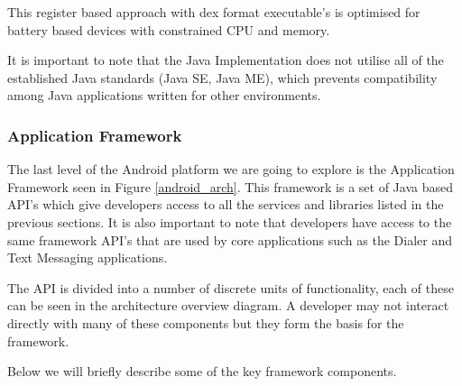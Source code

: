 This register based approach with dex format executable’s is optimised for battery based devices with constrained CPU and memory. 

It is important to note that the Java Implementation does not utilise all of the established Java standards (Java SE, Java ME), which prevents compatibility among Java applications written for other environments.

\subsubsection{Application Framework}
The last level of the Android platform we are going to explore is the Application Framework seen in Figure \ref{android_arch}. This framework is a set of Java based API’s which give developers access to all the services and libraries listed in the previous sections. It is also important to note that developers have access to the same framework API’s that are used by core applications such as the Dialer and Text Messaging applications.

The API is divided into a number of discrete units of functionality, each of these can be seen in the architecture overview diagram. A developer may not interact directly with many of these components but they form the basis for the framework.

Below we will briefly describe some of the key framework components.

